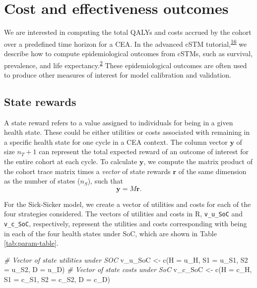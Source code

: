 \documentclass[
]{article}
\newenvironment{Shaded}{\begin{snugshade}}{\end{snugshade}}
\newcommand{\AttributeTok}[1]{\textcolor[rgb]{0.77,0.63,0.00}{#1}}
\newcommand{\CommentTok}[1]{\textcolor[rgb]{0.56,0.35,0.01}{\textit{#1}}}
\newcommand{\FunctionTok}[1]{\textcolor[rgb]{0.00,0.00,0.00}{#1}}
\newcommand{\NormalTok}[1]{#1}
\newcommand{\OtherTok}[1]{\textcolor[rgb]{0.56,0.35,0.01}{#1}}
\begin{document}
\hypertarget{cost-and-effectiveness-outcomes}{%
\section{Cost and effectiveness outcomes}\label{cost-and-effectiveness-outcomes}}

We are interested in computing the total QALYs and costs accrued by the cohort over a predefined time horizon for a CEA. In the advanced cSTM tutorial,\textsuperscript{\protect\hyperlink{ref-Alarid-Escudero2021b}{16}} we describe how to compute epidemiological outcomes from cSTMs, such as survival, prevalence, and life expectancy.\textsuperscript{\protect\hyperlink{ref-Siebert2012c}{2}} These epidemiological outcomes are often used to produce other measures of interest for model calibration and validation.

\hypertarget{state-rewards}{%
\subsection{State rewards}\label{state-rewards}}

A state reward refers to a value assigned to individuals for being in a given health state. These could be either utilities or costs associated with remaining in a specific health state for one cycle in a CEA context. The column vector \(\mathbf{y}\) of size \(n_T+1\) can represent the total expected reward of an outcome of interest for the entire cohort at each cycle. To calculate \(\mathbf{y}\), we compute the matrix product of the cohort trace matrix times a \emph{vector} of state rewards \(\mathbf{r}\) of the same dimension as the number of states (\(n_S\)), such that
\begin{equation}
  \mathbf{y} = M\mathbf{r}.
  \label{eq:exp-rew-cycle}
\end{equation}

For the Sick-Sicker model, we create a vector of utilities and costs for each of the four strategies considered. The vectors of utilities and costs in R, \texttt{v\_u\_SoC} and \texttt{v\_c\_SoC}, respectively, represent the utilities and costs corresponding with being in each of the four health states under SoC, which are shown in Table \ref{tab:param-table}.

\begin{Shaded}
\begin{Highlighting}[]
\CommentTok{\# Vector of state utilities under SOC}
\NormalTok{v\_u\_SoC }\OtherTok{\textless{}{-}} \FunctionTok{c}\NormalTok{(}\AttributeTok{H =}\NormalTok{ u\_H, }\AttributeTok{S1 =}\NormalTok{ u\_S1, }\AttributeTok{S2 =}\NormalTok{ u\_S2, }\AttributeTok{D =}\NormalTok{ u\_D)}
\CommentTok{\# Vector of state costs under SoC}
\NormalTok{v\_c\_SoC }\OtherTok{\textless{}{-}} \FunctionTok{c}\NormalTok{(}\AttributeTok{H =}\NormalTok{ c\_H, }\AttributeTok{S1 =}\NormalTok{ c\_S1, }\AttributeTok{S2 =}\NormalTok{ c\_S2, }\AttributeTok{D =}\NormalTok{ c\_D)}
\end{Highlighting}
\end{Shaded}
\end{document}
